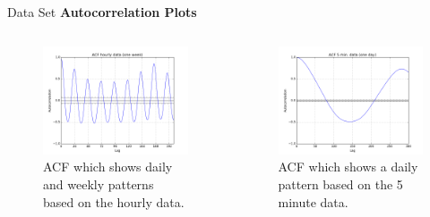 \documentclass{beamer}
\begin{document}
    \begin{frame}{Data Set}   
    \textbf{Autocorrelation Plots}
    \begin{columns}[c]
      \begin{figure}
       \includegraphics[width=1.05\textwidth]{images/ACF_week.png}
       \caption{ACF which shows daily and weekly patterns based on the hourly data.}
      \end{figure}

        \begin{figure}
         \includegraphics[width=1.05\textwidth]{images/ACF_day.png}
         \caption{ACF which shows a daily pattern based on the 5 minute data.}
        \end{figure}
    \end{columns}
  \end{frame}  
  
  
\end{document}
